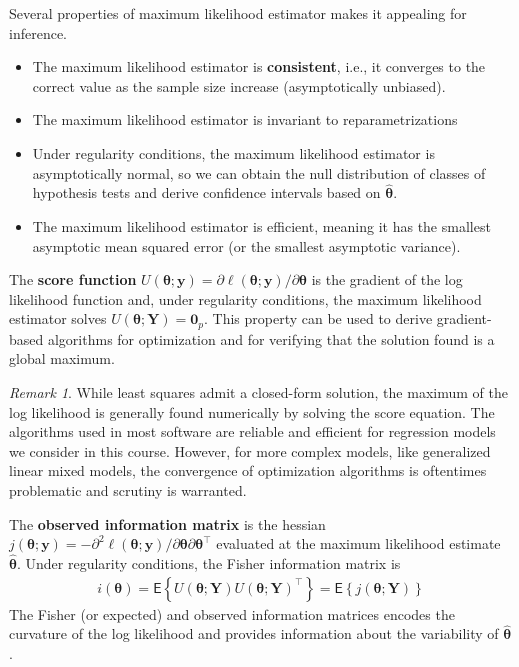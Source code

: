 \documentclass[
  11pt,
  letterpaper,
]{book}
\providecommand{\tightlist}{%
  \setlength{\itemsep}{0pt}\setlength{\parskip}{0pt}}
\theoremstyle{definition}
\theoremstyle{definition}
\theoremstyle{definition}
\theoremstyle{remark}
\newtheorem*{remark}{Remark}
\begin{document}
Several properties of maximum likelihood estimator makes it appealing for inference.

\begin{itemize}
\tightlist
\item
  The maximum likelihood estimator is \textbf{consistent}, i.e., it converges to the correct value as the sample size increase (asymptotically unbiased).
\item
  The maximum likelihood estimator is invariant to reparametrizations
\item
  Under regularity conditions, the maximum likelihood estimator is asymptotically normal, so we can obtain the null distribution of classes of hypothesis tests and derive confidence intervals based on \(\widehat{\boldsymbol{\theta}}\).
\item
  The maximum likelihood estimator is efficient, meaning it has the smallest asymptotic mean squared error (or the smallest asymptotic variance).
\end{itemize}

The \textbf{score function} \(U(\boldsymbol{\theta}; \boldsymbol{y}) = \partial \ell(\boldsymbol{\theta}; \boldsymbol{y})/ \partial \boldsymbol{\theta}\) is the gradient of the log likelihood function and, under regularity conditions, the maximum likelihood estimator solves \(U(\boldsymbol{\theta}; \boldsymbol{Y})=\boldsymbol{0}_p\). This property can be used to derive gradient-based algorithms for optimization and for verifying that the solution found is a global maximum.

\begin{remark}
{}While least squares admit a closed-form solution, the maximum of the log likelihood is generally found numerically by solving the score equation. The algorithms used in most software are reliable and efficient for regression models we consider in this course. However, for more complex models, like generalized linear mixed models, the convergence of optimization algorithms is oftentimes problematic and scrutiny is warranted.
\end{remark}

The \textbf{observed information matrix} is the hessian \(j(\boldsymbol{\theta}; \boldsymbol{y})=-\partial^2 \ell(\boldsymbol{\theta}; \boldsymbol{y})/\partial \boldsymbol{\theta} \partial \boldsymbol{\theta}^\top\) evaluated at the maximum likelihood estimate \(\widehat{\boldsymbol{\theta}}\).
Under regularity conditions, the Fisher information matrix is
\begin{align*}
i(\boldsymbol{\theta}) = \mathsf{E}\left\{U(\boldsymbol{\theta}; \boldsymbol{Y}) U(\boldsymbol{\theta}; \boldsymbol{Y})^\top\right\} = \mathsf{E}\left\{j(\boldsymbol{\theta}; \boldsymbol{Y})\right\}
\end{align*}
The Fisher (or expected) and observed information matrices encodes the curvature of the log likelihood and provides information about the variability of \(\widehat{\boldsymbol{\theta}}\).
\end{document}
